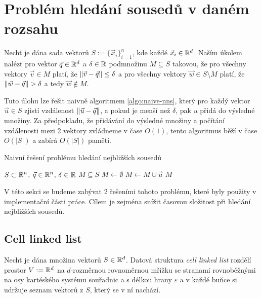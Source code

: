 \section{Problém hledání sousedů v daném rozsahu}

\begin{defi}
  \label{defi:nns}
  Nechť je dána sada vektorů $S := \{\vec{x}_i\}_{i = 1}^n$, kde každé $\vec{x}_i \in \mathbb{R}^d$. Naším úkolem nalézt pro vektor $\vec{q} \in \mathbb{R}^d$ a $\delta \in \mathbb{R}$ podmnožinu $M \subseteq S$ takovou, že pro všechny vektory $\vec{v} \in M$ platí, že $\|\vec{v} - \vec{q}\| \leq \delta$ a pro všechny vektory $\vec{w} \in S \setminus M$ platí, že $\|\vec{w} - \vec{q}\| > \delta$ a tedy $\vec{w} \not\in M$.
\end{defi}

Tuto úlohu lze řešit naivně algoritmem \ref{algo:naive-nns}, který pro každý vektor $\vec{u} \in S$ zjistí vzdálenost $\|\vec{u} - \vec{q}\|$, a pokud je menší než $\delta$, pak $u$ přidá do výsledné množiny. Za předpokladu, že přidávání do výsledné množiny a počítání vzdálenosti mezi 2 vektory zvládneme v čase $O(1)$, tento algoritmus běží v čase $O(|S|)$ a zabírá $O(|S|)$ paměti.

\begin{algorithm}[ht!]
  \caption{Naivní řešení problému hledání nejbližších sousedů}
  \label{algo:naive-nns}
  \begin{algorithmic}
    \Require $S \subset \mathbb{R}^n$, $\vec{q} \in \mathbb{R}^n$, $\delta \in \mathbb{R}$
    \Ensure $M \subseteq S$
      \State $M \leftarrow \emptyset$
            \State $M \leftarrow M \cup \vec{u}$
          \EndIf
      \EndFor
    \State \Return $M$
    \EndProcedure
  \end{algorithmic}
\end{algorithm}

V této sekci se budeme zabývat 2 řešeními tohoto problému, které byly použity v implementační části práce. Cílem je zejména snížit časovou složitost při hledání nejbližších sousedů.

\subsection{Cell linked list}

\label{defi:cll}
\begin{defi}
  Nechť je dána množina vektorů $S \in \mathbb{R}^d$. Datová struktura \textit{cell linked list} rozdělí prostor $V := \mathbb{R}^d$ na $d$-rozměrnou rovnoměrnou mřížku se stranami rovnoběžnými na osy kartéského systému souřadnic a s délkou hrany $\varepsilon$ a v každé buňce si udržuje seznam vektorů z $S$, který se v ní nachází.\cite[s.~149--152]{computer_simulation_of_liquids}
\end{defi}

